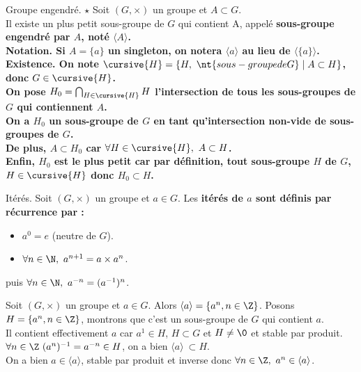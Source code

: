 \documentclass[11pt]{article}
\begin{document}
\begin{defi}{Groupe engendré. $\star$}{}
    Soit $(G,\times)$ un groupe et $A\subset G$.\\
    Il existe un plus petit sous-groupe de $G$ qui contient A, appelé \bf{sous-groupe engendré} par $A$, noté $\langle A\rangle $.\\
    \bf{Notation.} Si $A=\{a\}$ un singleton, on notera $\langle a\rangle $ au lieu de $\langle \{a\}\rangle $.
    \tcblower
    \bf{Existence.} On note $\cursive{H}=\{H, ~ \nt{sous-groupe de G} \mid A\subset H\}$, donc $G\in \cursive{H}$.\\
    On pose $H_0=\bigcap_{H\in\cursive{H}}H$ l'intersection de tous les sous-groupes de $G$ qui contiennent $A$.\\
    On a $H_0$ un sous-groupe de $G$ en tant qu'intersection non-vide de sous-groupes de $G$.\\
    De plus, $A\subset H_0$ car $\forall H \in \cursive{H}, ~ A\subset H$.\\
    Enfin, $H_0$ est le plus petit car par définition, tout sous-groupe $H$ de $G$, $H\in\cursive{H}$ donc $H_0\subset H$.
\end{defi}

\begin{defi}{Itérés.}{}
    Soit $(G,\times)$ un groupe et $a\in G$. Les \bf{itérés} de $a$ sont définis par récurrence par :
    \begin{itemize}
        \item $a^0=e$ (neutre de $G$).
        \item $\forall n \in \N, ~ a^{n+1}=a\times a^n$.
    \end{itemize}
    puis $\forall n \in \N, ~ a^{-n}=(a^{-1})^{n}$.
\end{defi}

\vspace*{-0.8cm}

\begin{thm}{}{}
    Soit $(G,\times)$ un groupe et $a\in G$. Alors $\langle a\rangle =\{a^n,n\in\Z\}$.
    \tcblower
    Posons $H=\{a^n, n\in \Z\}$, montrons que c'est un sous-groupe de $G$ qui contient $a$.\\
    Il contient effectivement $a$ car $a^1\in H$, $H\subset G$ et $H\neq\0$ et stable par produit.\\
    \boxed{\subset} $\forall n \in \Z ~ (a^n)^{-1}=a^{-n}\in H$, on a bien $\langle a\rangle ~\subset H$.\\
    \boxed{\supset} On a bien $a\in\langle a\rangle $, stable par produit et inverse donc $\forall n \in \Z, ~ a^n \in\langle a\rangle $.
\end{thm}
\end{document}
